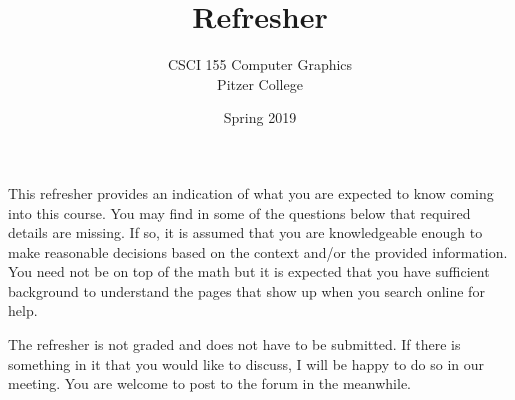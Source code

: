 \documentclass[a4paper]{exam}
\title{Refresher}
\author{CSCI 155 Computer Graphics\\Pitzer College}
\date{Spring 2019}
\begin{document}
\maketitle

This refresher provides an indication of what you are expected to know coming into this course. You may find in some of the questions below that required details are missing. If so, it is assumed that you are knowledgeable enough to make reasonable decisions based on the context and/or the provided information. You need not be on top of the math but it is expected that you have sufficient background to understand the pages that show up when you search online for help.

The refresher is not graded and does not have to be submitted. If there is something in it that you would like to discuss, I will be happy to do so in our meeting. You are welcome to post to the forum in the meanwhile.
\end{document}
